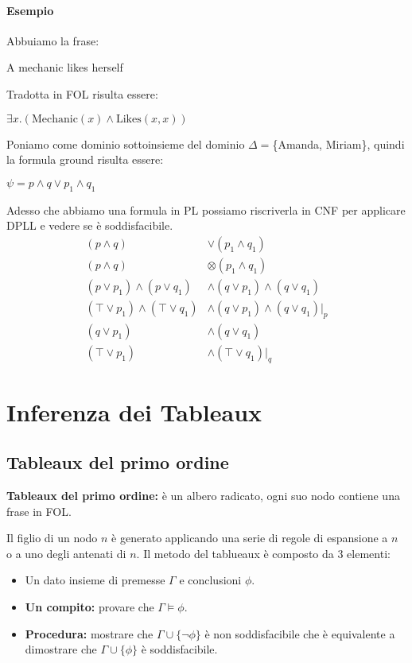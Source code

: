 \documentclass[../main.tex]{subfiles}
\newcommand{\spazio}{\vspace{1em} \newline}
\begin{document}
  \subsubsection{Esempio}
  Abbuiamo la frase:
  \begin{center}
      A mechanic likes herself
  \end{center}
  Tradotta in FOL risulta essere:
  \begin{center}
      $\exists x.(\text{Mechanic}(x) \land \text{Likes}(x, x))$
  \end{center}
  Poniamo come dominio sottoinsieme del dominio $\Delta=$\{Amanda, Miriam\}, quindi la formula ground risulta essere:
  \begin{center}
      $\psi = p \land q \lor p_1 \land q_1$
  \end{center}
  Adesso che abbiamo una formula in PL possiamo riscriverla in CNF per applicare DPLL e vedere se è soddisfacibile.
  \begin{align*}
      (p \land q) & \lor (p_1 \land q_1)\\
      (p \land q)  & \otimes (p_1 \land q_1)\\
      (p \lor p_1) \land (p \lor q_1) & \land (q \lor p_1) \land (q \lor q_1)\\
      ( \top \lor p_1) \land ( \top \lor q_1) & \land (q \lor p_1) \land (q \lor q_1)|_p\\
      (q \lor p_1) & \land (q \lor q_1)\\
      ( \top \lor p_1) & \land ( \top \lor q_1)|_q
  \end{align*}

  \chapter{Inferenza dei Tableaux}
  \section{Tableaux del primo ordine}
  \textbf{Tableaux del primo ordine:} è un albero radicato, ogni suo nodo contiene una frase in FOL.

  Il figlio di un nodo $n$ è generato applicando una serie di regole di espansione a $n$ o a uno degli antenati di $n$.
  \spazio
  Il metodo del tablueaux è composto da 3 elementi:
  \begin{itemize}
      \item Un dato insieme di premesse $\Gamma$ e conclusioni $\phi$.
      \item \textbf{Un compito:} provare che $\Gamma \models \phi$.
      \item \textbf{Procedura:} mostrare che $\Gamma \cup \{ \lnot \phi \}$ è non soddisfacibile che è equivalente a dimostrare che $\Gamma \cup \{ \phi \}$ è soddisfacibile.
  \end{itemize}
\end{document}
